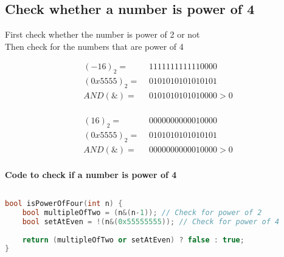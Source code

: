 \subsection{Check whether a number is power of 4}
 First check whether the number is power of 2 or not\\
 Then check for the numbers that are power of 4

\setlength{\columnsep}{3 cm}
\begin{multicols}{2}

\begin{center}
\begin{align*}
	(-16)_2 =&\hspace{4pt} 1111111111110000\\
	(0x5555)_2 =&\hspace{4pt} 0101010101010101\\
	\hline
	AND(\&) =&\hspace{4pt} 0101010101010000 > 0\\	
\end{align*}
\end{center}

\columnbreak

\begin{center}
\begin{align*}
	(16)_2 =&\hspace{4pt} 0000000000010000\\
	(0x5555)_2 =&\hspace{4pt} 0101010101010101\\
	\hline
	AND(\&) =&\hspace{4pt} 0000000000010000 > 0\\
\end{align*}
\end{center}

\end{multicols}

\textbf{Code to check if a number is power of 4}

\begin{lstlisting}[language=c++]

bool isPowerOfFour(int n) {
    bool multipleOfTwo = (n&(n-1)); // Check for power of 2
    bool setAtEven = !(n&(0x55555555)); // Check for power of 4
    
    return (multipleOfTwo or setAtEven) ? false : true;
}
\end{lstlisting}


\newpage
